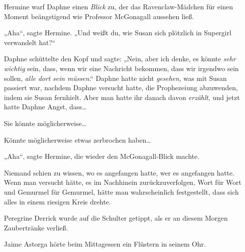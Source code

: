 Hermine warf Daphne einen \emph{Blick} zu, der das Ravenclaw-Mädchen für einen Moment beängstigend wie Professor McGonagall aussehen ließ.

„Aha“, sagte Hermine. „Und weißt du, wie Susan sich plötzlich in Supergirl verwandelt hat?“

Daphne schüttelte den Kopf und sagte: „Nein, aber ich denke, es könnte \emph{sehr wichtig} sein, dass, wenn wir eine Nachricht bekommen, dass wir irgendwo sein sollen, \emph{alle dort sein müssen}.“ Daphne hatte nicht \emph{gesehen}, was mit Susan passiert war, nachdem Daphne versucht hatte, die Prophezeiung abzuwenden, indem sie Susan fernhielt. Aber man hatte ihr danach davon \emph{erzählt}, und jetzt hatte Daphne Angst, dass…

Sie könnte möglicherweise…

Könnte möglicherweise etwas zerbrochen haben…

„Aha“, sagte Hermine, die wieder den McGonagall-Blick machte.

\later

Niemand schien zu wissen, wo es angefangen hatte, wer es angefangen hatte. Wenn man versucht hätte, es im Nachhinein zurückzuverfolgen, Wort für Wort und Gemurmel für Gemurmel, hätte man wahrscheinlich festgestellt, dass sich alles in einem riesigen Kreis drehte.

Peregrine Derrick wurde auf die Schulter getippt, als er an diesem Morgen Zaubertränke verließ.

Jaime Astorga hörte beim Mittagessen ein Flüstern in seinem Ohr.

